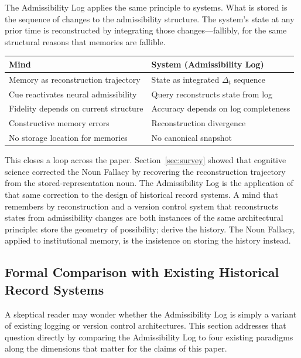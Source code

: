 \documentclass[12pt, a4paper]{article}
\theoremstyle{plain}
\theoremstyle{definition}
\theoremstyle{remark}
\begin{document}
The Admissibility Log applies the same principle to systems. What is stored is
the sequence of changes to the admissibility structure. The system's state at
any prior time is reconstructed by integrating those changes---fallibly, for
the same structural reasons that memories are fallible.

\begin{center}
\begin{tabular}{ll}
\toprule
\textbf{Mind} & \textbf{System (Admissibility Log)} \\
\midrule
Memory as reconstruction trajectory & State as integrated $\Delta_t$ sequence \\
Cue reactivates neural admissibility & Query reconstructs state from log \\
Fidelity depends on current structure & Accuracy depends on log completeness \\
Constructive memory errors & Reconstruction divergence \\
No storage location for memories & No canonical snapshot \\
\bottomrule
\end{tabular}
\end{center}

This closes a loop across the paper. Section~\ref{sec:survey} showed that
cognitive science corrected the Noun Fallacy by recovering the reconstruction
trajectory from the stored-representation noun. The Admissibility Log is the
application of that same correction to the design of historical record systems.
A mind that remembers by reconstruction and a version control system that
reconstructs states from admissibility changes are both instances of the same
architectural principle: store the geometry of possibility; derive the history.
The Noun Fallacy, applied to institutional memory, is the insistence on storing
the history instead.

\subsection{Formal Comparison with Existing Historical Record Systems}
\label{subsec:comparison}

A skeptical reader may wonder whether the Admissibility Log is simply a
variant of existing logging or version control architectures. This section
addresses that question directly by comparing the Admissibility Log to four
existing paradigms along the dimensions that matter for the claims of this paper.
\end{document}
